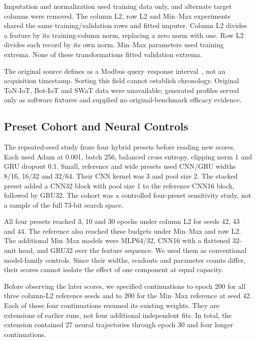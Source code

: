 \begin{table}[!t]\centering\caption{Verified Gas Pipeline class names. Original numeric targets were preserved.}\label{tab:class_names}
\resizebox{\columnwidth}{!}{}\end{table}

Imputation and normalization used training data only, and alternate target columns were removed. The column L2, row L2 and Min--Max experiments shared the same training/validation rows and fitted imputer. Column L2 divides a feature by its training-column norm, replacing a zero norm with one. Row L2 divides each record by its own norm. Min--Max parameters used training extrema. None of these transformations fitted validation extrema.

The original source defines  as a Modbus query--response interval~\cite{morris2014}, not an acquisition timestamp. Sorting this field cannot establish chronology. Original ToN-IoT, Bot-IoT and SWaT data were unavailable; generated profiles served only as software fixtures and supplied no original-benchmark efficacy evidence.

\subsection{Preset Cohort and Neural Controls}
The repeated-seed study froze four hybrid presets before reading new scores. Each used Adam at 0.001, batch 256, balanced cross entropy, clipping norm 1 and GRU dropout 0.1. Small, reference and wide presets used CNN/GRU widths 8/16, 16/32 and 32/64. Their CNN kernel was 3 and pool size 2. The stacked preset added a CNN32 block with pool size 1 to the reference CNN16 block, followed by GRU32. The cohort was a controlled four-preset sensitivity study, not a sample of the full 73-bit search space.

All four presets reached 3, 10 and 30 epochs under column L2 for seeds 42, 43 and 44. The reference also reached these budgets under Min--Max and row L2. The additional Min--Max models were MLP64/32, CNN16 with a flattened 32-unit head, and GRU32 over the feature sequence. We used them as conventional model-family controls. Since their widths, readouts and parameter counts differ, their scores cannot isolate the effect of one component at equal capacity.

Before observing the later scores, we specified continuations to epoch 200 for all three column-L2 reference seeds and to 200 for the Min--Max reference at seed 42. Each of these four continuations resumed its existing weights. They are extensions of earlier runs, not four additional independent fits. In total, the extension contained 27 neural trajectories through epoch 30 and four longer continuations.

